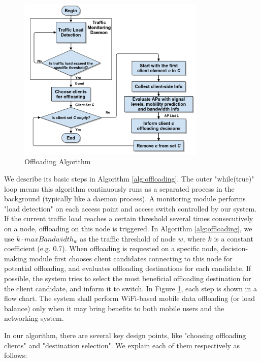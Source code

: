 \documentclass[english]{tktltiki}
\begin{document}
\begin{figure}[htbp]
  \centering
  \includegraphics[width=0.8\textwidth]{images/algorithm.png}
  \caption{Offloading Algorithm}
  \label{fig:algorithm}
\end{figure}


We describe its basic steps in Algorithm \ref{alg:offloading}. The outer "while(true)" loop means this algorithm continuously runs as a separated process in the background (typically like a daemon process). A monitoring module performs "load detection" on each access point and access switch controlled by our system. If the current traffic load reaches a certain threshold several times consecutively on a node, offloading on this node is triggered. In Algorithm \ref{alg:offloading}, we use $k \cdot maxBandwidth_w$ as the traffic threshold of node $w$, where $k$ is a constant coefficient (e.g. 0.7). When offloading is requested on a specific node, decision-making module first chooses client candidates connecting to this node for potential offloading, and evaluates offloading destinations for each candidate. If possible, the system tries to select the most beneficial offloading destination for the client candidate, and inform it to switch. In Figure \ref{fig:algorithm}, each step is shown in a flow chart. The system shall perform WiFi-based mobile data offloading (or load balance) only when it may bring benefits to both mobile users and the networking system.

In our algorithm, there are several key design points, like "choosing offloading clients" and "destination selection". We explain each of them respectively as follows:
\end{document}
